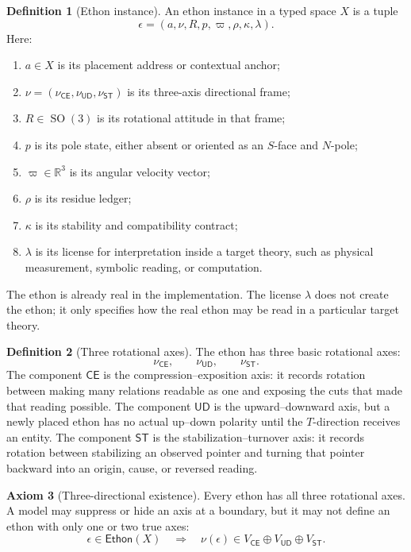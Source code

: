 \documentclass[11pt]{article}
\theoremstyle{definition}
\newtheorem{definition}{Definition}[section]
\newtheorem{axiom}[definition]{Axiom}
\theoremstyle{plain}
\newcommand{\Eth}{\mathsf{Ethon}}
\newcommand{\CE}{\mathsf{CE}}
\newcommand{\UD}{\mathsf{UD}}
\newcommand{\ST}{\mathsf{ST}}
\DeclareMathOperator{\SO}{SO}
\begin{document}
\begin{definition}[Ethon instance]
An ethon instance in a typed space \(X\) is a tuple
\[
  \epsilon
  =
  (a,\nu,R,p,\varpi,\rho,\kappa,\lambda).
\]
Here:
\begin{enumerate}[label=(\roman*),leftmargin=*]
  \item \(a\in X\) is its placement address or contextual anchor;
  \item \(\nu=(\nu_{\CE},\nu_{\UD},\nu_{\ST})\) is its
  three-axis directional frame;
  \item \(R\in\SO(3)\) is its rotational attitude in that frame;
  \item \(p\) is its pole state, either absent or oriented as an
  \(S\)-face and \(N\)-pole;
  \item \(\varpi\in\mathbb R^3\) is its angular velocity vector;
  \item \(\rho\) is its residue ledger;
  \item \(\kappa\) is its stability and compatibility contract;
  \item \(\lambda\) is its license for interpretation inside a target
  theory, such as physical measurement, symbolic reading, or computation.
\end{enumerate}
The ethon is already real in the implementation.  The license
\(\lambda\) does not create the ethon; it only specifies how the real
ethon may be read in a particular target theory.
\end{definition}

\begin{definition}[Three rotational axes]
The ethon has three basic rotational axes:
\[
  \nu_{\CE},\qquad \nu_{\UD},\qquad \nu_{\ST}.
\]
The component \(\CE\) is the compression--exposition axis: it records
rotation between making many relations readable as one and exposing the
cuts that made that reading possible.  The component \(\UD\) is the
upward--downward axis, but a newly placed ethon has no actual up--down
polarity until the \(T\)-direction receives an entity.  The component
\(\ST\) is the stabilization--turnover axis: it records rotation between
stabilizing an observed pointer and turning that pointer backward into an
origin, cause, or reversed reading.
\end{definition}

\begin{axiom}[Three-directional existence]
Every ethon has all three rotational axes.  A model may suppress or hide
an axis at a boundary, but it may not define an ethon with only one or
two true axes:
\[
  \epsilon\in\Eth(X)
  \quad\Rightarrow\quad
  \nu(\epsilon)\in
  V_{\CE}\oplus V_{\UD}\oplus V_{\ST}.
\]
\end{axiom}
\end{document}
